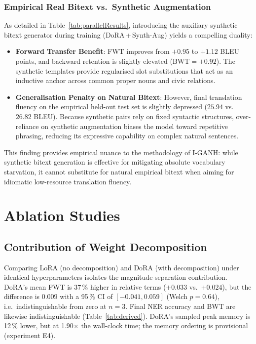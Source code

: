 \documentclass[11pt,a4paper]{article}
\begin{document}
\subsubsection{Empirical Real Bitext vs.\ Synthetic Augmentation}
As detailed in Table~\ref{tab:parallelResults}, introducing the auxiliary
synthetic bitext generator during training (DoRA\,+\,Synth-Aug) yields a
compelling duality:
\begin{itemize}
  \item \textbf{Forward Transfer Benefit}: FWT improves from $+0.95$ to
        $+1.12$ BLEU points, and backward retention is slightly elevated
        ($\text{BWT} = +0.92$).  The synthetic templates provide regularised
        slot substitutions that act as an inductive anchor across common
        proper nouns and civic relations.
  \item \textbf{Generalisation Penalty on Natural Bitext}: However, final
        translation fluency on the empirical held-out test set is slightly
        depressed ($25.94$ vs.\ $26.82$ BLEU).  Because synthetic pairs
        rely on fixed syntactic structures, over-reliance on synthetic
        augmentation biases the model toward repetitive phrasing, reducing
        its expressive capability on complex natural sentences.
\end{itemize}
This finding provides empirical nuance to the methodology of I-GANH: while
synthetic bitext generation is effective for mitigating absolute vocabulary
starvation, it cannot substitute for natural empirical bitext when aiming
for idiomatic low-resource translation fluency.

\section{Ablation Studies}
\label{sec:ablation}

\subsection{Contribution of Weight Decomposition}

Comparing LoRA (no decomposition) and DoRA (with decomposition) under
identical hyperparameters isolates the magnitude-separation
contribution.  DoRA's mean FWT is 37\,\% higher in relative terms
($+0.033$ vs.\ $+0.024$), but the difference is $0.009$ with a 95\,\%
CI of $[-0.041, 0.059]$ (Welch $p=0.64$), i.e.\ indistinguishable from
zero at $n=3$.  Final NER accuracy and BWT are likewise
indistinguishable (Table~\ref{tab:derived}).  DoRA's sampled peak
memory is 12\,\% lower, but at 1.90$\times$ the wall-clock time; the
memory ordering is provisional (experiment E4).
\end{document}
